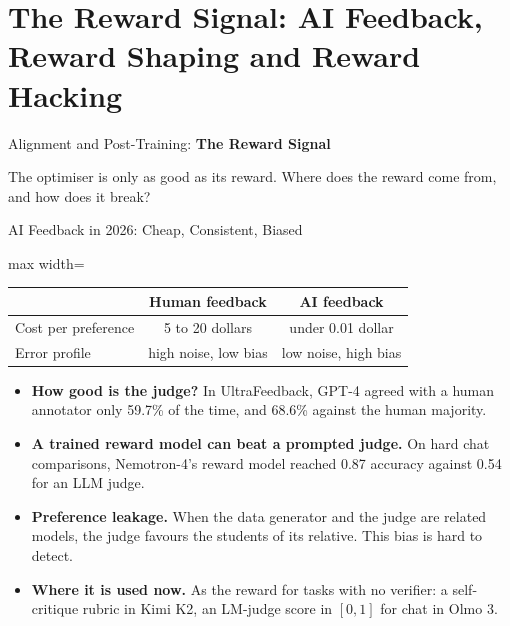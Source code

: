 \section{The Reward Signal: AI Feedback, Reward Shaping and Reward Hacking}

\begin{frame}{}
    \LARGE Alignment and Post-Training: \textbf{The Reward Signal}

    \vspace{1em}
    \normalsize The optimiser is only as good as its reward. Where does the reward come from, and how does it break?
\end{frame}

\begin{frame}{AI Feedback in 2026: Cheap, Consistent, Biased}
    \begin{center}
    \small
    \renewcommand{\arraystretch}{1.2}
    \begin{adjustbox}{max width=\linewidth}\begin{tabular}{lcc}
        \toprule
        & \textbf{Human feedback} & \textbf{AI feedback} \\
        \midrule
        Cost per preference & 5 to 20 dollars & under 0.01 dollar \\
        Error profile & high noise, low bias & \alert{low noise, high bias} \\
        \bottomrule
    \end{tabular}\end{adjustbox}
    \end{center}
    \begin{itemize}\itemsep0.25em
        \item \textbf{How good is the judge?} In UltraFeedback, GPT-4 agreed with a human annotator only 59.7\% of the time, and 68.6\% against the human majority.
        \item \textbf{A trained reward model can beat a prompted judge.} On hard chat comparisons, Nemotron-4's reward model reached 0.87 accuracy against 0.54 for an LLM judge.
        \item \textbf{Preference leakage.} When the data generator and the judge are related models, the judge favours the students of its relative. This bias is hard to detect.
        \item \textbf{Where it is used now.} As the reward for tasks with no verifier: a self-critique rubric in Kimi K2, an LM-judge score in $[0,1]$ for chat in Olmo 3.
    \end{itemize}
\end{frame}

